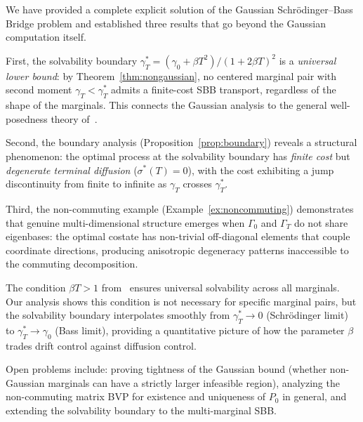\documentclass[12pt]{article}
\theoremstyle{definition}
\begin{document}
We have provided a complete explicit solution of the Gaussian
Schr\"odinger--Bass Bridge problem and established three results that
go beyond the Gaussian computation itself.

First, the solvability boundary
$\gamma_T^* = (\gamma_0 + \beta T^2)/(1+2\beta T)^2$
is a \emph{universal lower bound}: by Theorem~\ref{thm:nongaussian},
no centered marginal pair with second moment $\gamma_T < \gamma_T^*$
admits a finite-cost SBB transport, regardless of the shape of the
marginals.
This connects the Gaussian analysis to the general well-posedness
theory of~\cite{HLMPT26}.

Second, the boundary analysis (Proposition~\ref{prop:boundary}) reveals
a structural phenomenon: the optimal process at the solvability boundary
has \emph{finite cost} but \emph{degenerate terminal diffusion}
($\sigma^*(T) = 0$), with the cost exhibiting a jump discontinuity
from finite to infinite as $\gamma_T$ crosses $\gamma_T^*$.

Third, the non-commuting example (Example~\ref{ex:noncommuting})
demonstrates that genuine multi-dimensional structure emerges when
$\Gamma_0$ and $\Gamma_T$ do not share eigenbases: the optimal
costate has non-trivial off-diagonal elements that couple coordinate
directions, producing anisotropic degeneracy patterns inaccessible
to the commuting decomposition.

The condition $\beta T > 1$ from~\cite{HLMPT26} ensures universal
solvability across all marginals.
Our analysis shows this condition is not necessary for specific
marginal pairs, but the solvability boundary interpolates smoothly
from $\gamma_T^* \to 0$ (Schr\"odinger limit) to
$\gamma_T^* \to \gamma_0$ (Bass limit), providing a quantitative
picture of how the parameter $\beta$ trades drift control against
diffusion control.

Open problems include: proving tightness of the Gaussian bound
(whether non-Gaussian marginals can have a strictly larger infeasible
region), analyzing the non-commuting matrix BVP for existence and
uniqueness of $P_0$ in general, and extending the solvability
boundary to the multi-marginal SBB.
\end{document}
